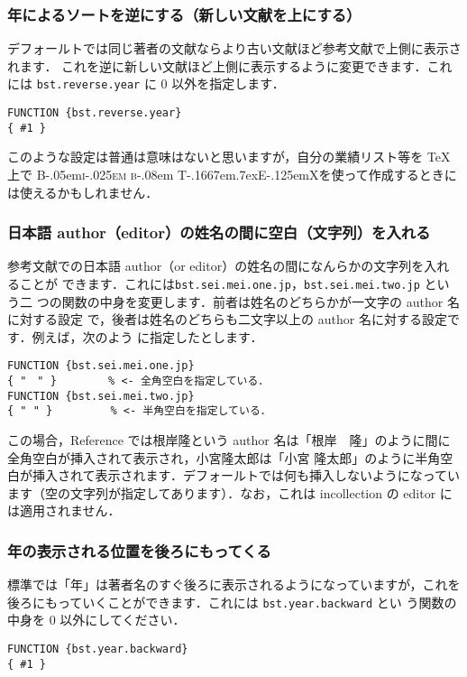 \documentclass[article]{jlreq}
\newcommand{\BibTeX}{\textrm{B\kern-.05em\textsc{i\kern-.025em b}\kern-.08em%
T\kern-.1667em\lower.7ex\hbox{E}\kern-.125emX}}
\begin{document}
\subsubsection{年によるソートを逆にする（新しい文献を上にする）}

デフォールトでは同じ著者の文献ならより古い文献ほど参考文献で上側に表示されます．
これを逆に新しい文献ほど上側に表示するように変更できます．これには
\texttt{bst.reverse.year} に 0 以外を指定します．
\begin{screen}
\begin{verbatim}
FUNCTION {bst.reverse.year}
{ #1 }
\end{verbatim}
\end{screen}

このような設定は普通は意味はないと思いますが，自分の業績リスト等を \TeX 
上で \BibTeX を使って作成するときには使えるかもしれません．

\subsubsection{日本語 author（editor）の姓名の間に空白（文字列）を入れる}

参考文献での日本語 author（or editor）の姓名の間になんらかの文字列を入れることが
できます．これには\verb|bst.sei.mei.one.jp|，\verb|bst.sei.mei.two.jp| という二
つの関数の中身を変更します．前者は姓名のどちらかが一文字の author 名に対する設定
で，後者は姓名のどちらも二文字以上の author 名に対する設定です．例えば，次のよう
に指定したとします．
\begin{screen}
\begin{verbatim}
FUNCTION {bst.sei.mei.one.jp}
{ "　" }        % <- 全角空白を指定している．
FUNCTION {bst.sei.mei.two.jp}
{ " " }         % <- 半角空白を指定している．
\end{verbatim}
\end{screen}

この場合，Reference では根岸隆という author 名は「根岸　隆」のように間に
全角空白が挿入されて表示され，小宮隆太郎は「小宮 隆太郎」のように半角空
白が挿入されて表示されます．デフォールトでは何も挿入しないようになってい
ます（空の文字列が指定してあります）．なお，これは incollection の editor 
には適用されません．

\subsubsection{年の表示される位置を後ろにもってくる}

標準では「年」は著者名のすぐ後ろに表示されるようになっていますが，これを
後ろにもっていくことができます．これには \texttt{bst.year.backward} とい
う関数の中身を 0 以外にしてください．
\begin{screen}
\begin{verbatim}
FUNCTION {bst.year.backward}
{ #1 }
\end{verbatim}
\end{screen}
\end{document}
